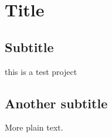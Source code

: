\documentclass{article}
\begin{document}
\section{Title}

\subsection{Subtitle}

this is a test project

\subsection{Another subtitle}

More plain text.
\end{document}
